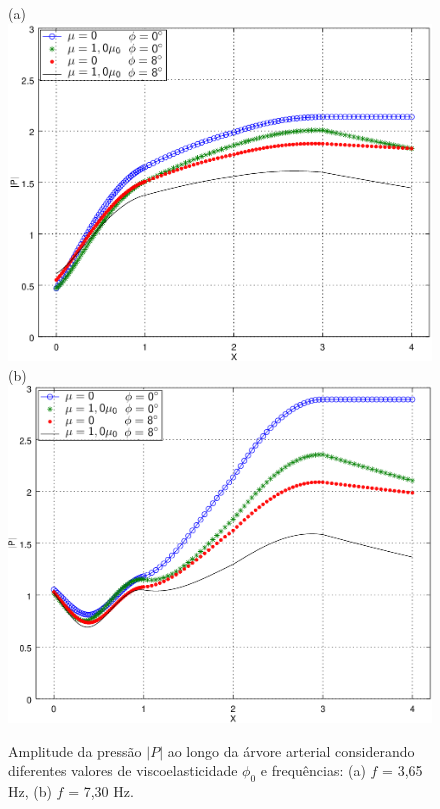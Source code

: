 \begin{figure}[!htbp]
	\centering
	(a) \\
	\includegraphics[scale=0.7]{Figures/fig5_P_f3_65_viscoelasticity_viscosity_NEW.png}\\
	(b)\\
	\includegraphics[scale=0.7]{Figures/fig5_P_f7_30_viscoelasticity_viscosity_NEW.png}\\
	\caption{Amplitude da pressão $|P|$ ao longo da árvore arterial considerando diferentes valores de viscoelasticidade $\phi_0$ e frequências: (a) $f$ = 3,65 Hz, (b)  $f$ = 7,30 Hz. }
	\label{fig5a:arterial-tree}%
\end{figure}

